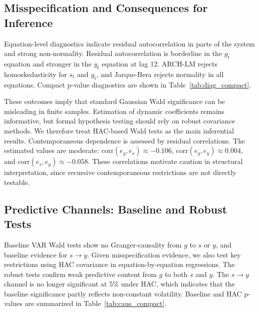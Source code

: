 \documentclass[12pt]{article}
\begin{document}


\subsection{Misspecification and Consequences for Inference}

Equation-level diagnostics indicate residual autocorrelation in parts of the system and strong non-normality. Residual autocorrelation is borderline in the $g_t$ equation and stronger in the $y_t$ equation at lag 12. ARCH-LM rejects homoskedasticity for $s_t$ and $y_t$, and Jarque-Bera rejects normality in all equations.
Compact p-value diagnostics are shown in Table~\ref{tab:diag_compact}.




These outcomes imply that standard Gaussian Wald significance can be misleading in finite samples. Estimation of dynamic coefficients remains informative, but formal hypothesis testing should rely on robust covariance methods. We therefore treat HAC-based Wald tests as the main inferential results.
\newline
\newline
Contemporaneous dependence is assessed by residual correlations. The estimated values are moderate: $\text{corr}(e_g,e_s)\approx -0.106$, $\text{corr}(e_g,e_y)\approx 0.004$, and $\text{corr}(e_s,e_y)\approx -0.058$. These correlations motivate caution in structural interpretation, since recursive contemporaneous restrictions are not directly testable.

\subsection{Predictive Channels: Baseline and Robust Tests}

Baseline VAR Wald tests show no Granger-causality from $g$ to $s$ or $y$, and baseline evidence for $s\rightarrow y$.
\newline
Given misspecification evidence, we also test key restrictions using HAC covariance in equation-by-equation regressions. The robust tests confirm weak predictive content from $g$ to both $s$ and $y$. The $s\rightarrow y$ channel is no longer significant at 5\% under HAC, which indicates that the baseline significance partly reflects non-constant volatility.
Baseline and HAC p-values are summarized in Table~\ref{tab:caus_compact}.


\end{document}
